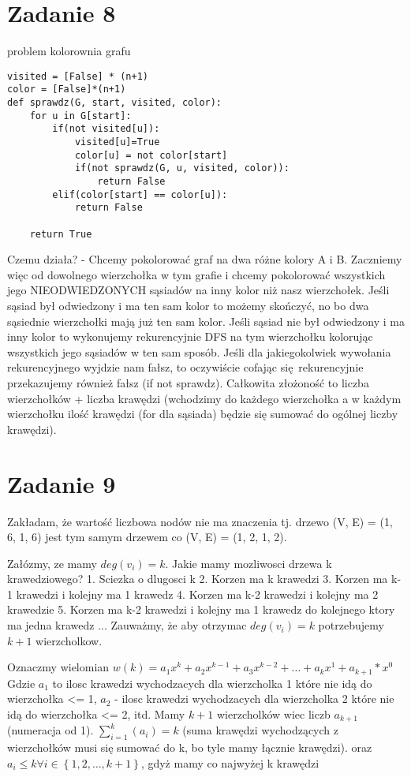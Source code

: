 \documentclass[12pt]{article}
\newcommand{\set}[1]{\left \{ #1 \right \}}				%
\begin{document}
\section{Zadanie 8}
problem kolorownia grafu 
\begin{lstlisting}
visited = [False] * (n+1)
color = [False]*(n+1)
def sprawdz(G, start, visited, color):
    for u in G[start]:
        if(not visited[u]):
            visited[u]=True 
            color[u] = not color[start]
            if(not sprawdz(G, u, visited, color)):
                return False 
        elif(color[start] == color[u]):
            return False 

    return True 
\end{lstlisting}
Czemu działa? - Chcemy pokolorować graf na dwa różne kolory A i B. Zaczniemy więc od dowolnego wierzchołka w tym grafie i chcemy pokolorować wszystkich jego NIEODWIEDZONYCH sąsiadów na inny kolor niż nasz wierzchołek. Jeśli sąsiad był odwiedzony i ma ten sam kolor to możemy skończyć, no bo dwa sąsiednie wierzchołki mają już ten sam kolor. Jeśli sąsiad nie był odwiedzony i ma inny kolor to wykonujemy rekurencyjnie DFS na tym wierzchołku kolorując wszystkich jego sąsiadów w ten sam sposób. Jeśli dla jakiegokolwiek wywołania rekurencyjnego wyjdzie nam fałsz, to oczywiście cofając się rekurencyjnie przekazujemy również fałsz (if not sprawdz).
Całkowita złożoność to liczba wierzchołków + liczba krawędzi (wchodzimy do każdego wierzchołka a w każdym wierzchołku ilość krawędzi (for dla sąsiada) będzie się sumować do ogólnej liczby krawędzi).
\section{Zadanie 9}
Zakładam, że wartość liczbowa nodów nie ma znaczenia tj. drzewo (V, E) = ({1, 6}, {1, 6}) jest tym samym drzewem co (V, E) = ({1, 2}, {1, 2}). 

Załózmy, ze mamy $deg(v_i) = k$. Jakie mamy mozliwosci drzewa k krawedziowego?
1. Sciezka o dlugosci k 
2. Korzen ma k krawedzi 
3. Korzen ma k-1 krawedzi i kolejny ma 1 krawedz 
4. Korzen ma k-2 krawedzi i kolejny ma 2 krawedzie 
5. Korzen ma k-2 krawedzi i kolejny ma 1 krawedz do kolejnego ktory ma jedna krawedz 
...
Zauważmy, że aby otrzymac $deg(v_i) = k$ potrzebujemy $k+1$ wierzcholkow.

Oznaczmy wielomian 
$w(k) = a_1x^k + a_2x^{k-1} + a_3x^{k-2} + \dots + a_{k}x^1 + a_{k+1}*x^0$
Gdzie $a_1$ to ilosc krawedzi wychodzacych dla wierzcholka 1 które nie idą do wierzchołka <= 1, $a_2$ - ilosc krawedzi wychodzacych dla wierzcholka 2 które nie idą do wierzchołka <= 2, itd.
Mamy $k+1$ wierzcholków wiec liczb $a_{k+1}$ (numeracja od 1).
$\sum_{i=1}^k (a_i) = k$ (suma krawędzi wychodzących z wierzchołków musi się sumować do k, bo tyle mamy łącznie krawędzi).
oraz 
$a_i \leq k \forall i \in \set{1, 2, \dots, k+1}$, gdyż mamy co najwyżej k krawędzi 
\end{document}
